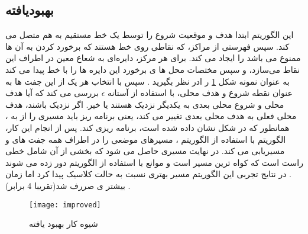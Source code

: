 
\subsection{بهبودیافته}
این الگوریتم ابتدا هدف و موقعیت شروع را توسط یک خط مستقیم به هم متصل می کند. سپس فهرستی از مراکز، که نقاطی روی خط هستند که برخورد کردن به آن ها ممنوع می باشد را  ایجاد می کند. برای هر مرکز، دایره‌ای به شعاع معین  
در اطراف این نقاط می‌سازد، و سپس مختصات محل ها ی برخورد این دایره ها را با خط پیدا می کند به عنوان نمونه شکل 
\ref{improved}
ر ادر نظر بگیرید . سپس با انتخاب هر یک از این جفت ها به عنوان نقطه شروع و هدف محلی، با استفاده از آستانه
$\epsilon$
بررسی می کند که آیا هدف محلی 
و شروع محلی بعدی 
به یکدیگر نزدیک هستند یا خیر. اگر نزدیک باشند، هدف محلی فعلی به هدف محلی بعدی تغییر می کند، یعنی برنامه ریز باید مسیری را از 
به
، همانطور که در شکل نشان داده شده است، برنامه ریزی کند. پس از انجام این کار، الگوریتم با استفاده از الگوریتم 
، مسیرهای موضعی را در اطراف همه جفت های 
و 
مسیریابی می کند.  در نهایت مسیری حاصل می شود که بخشی از آن شامل خطی راست است که کواه ترین مسیر است و موانع با استفاده از الگوریتم
دور زده می شوند .
در نتایج تجربی این الگوریتم مسیر بهتری نسبت به حالت کلاسیک پیدا کرد اما زمان بیشتر ی صررف شد(تقریبا 4 برابر) .
\begin{figure}[h]
	\texttt{[image: improved]}
	\centering
	\caption{ شیوه کار  بهبود یافته}
	\cite{paliwal2023survey}
	\label{improved}
\end{figure}